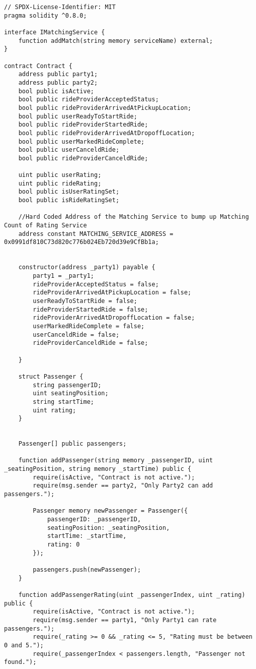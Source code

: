 \begin{lstlisting}
// SPDX-License-Identifier: MIT
pragma solidity ^0.8.0;

interface IMatchingService {
    function addMatch(string memory serviceName) external;
}

contract Contract {
    address public party1;
    address public party2;
    bool public isActive;
    bool public rideProviderAcceptedStatus;
    bool public rideProviderArrivedAtPickupLocation;
    bool public userReadyToStartRide;
    bool public rideProviderStartedRide;
    bool public rideProviderArrivedAtDropoffLocation;
    bool public userMarkedRideComplete;
    bool public userCanceldRide;
    bool public rideProviderCanceldRide;

    uint public userRating;
    uint public rideRating;
    bool public isUserRatingSet;
    bool public isRideRatingSet;

    //Hard Coded Address of the Matching Service to bump up Matching Count of Rating Service
    address constant MATCHING_SERVICE_ADDRESS = 0x0991df810C73d820c776b024Eb720d39e9CfBb1a;


    constructor(address _party1) payable {
        party1 = _party1;
        rideProviderAcceptedStatus = false;
        rideProviderArrivedAtPickupLocation = false;
        userReadyToStartRide = false;
        rideProviderStartedRide = false;
        rideProviderArrivedAtDropoffLocation = false;
        userMarkedRideComplete = false;
        userCanceldRide = false;
        rideProviderCanceldRide = false;

    }

    struct Passenger {
        string passengerID;
        uint seatingPosition;
        string startTime;
        uint rating;
    }


    Passenger[] public passengers;

    function addPassenger(string memory _passengerID, uint _seatingPosition, string memory _startTime) public {
        require(isActive, "Contract is not active.");
        require(msg.sender == party2, "Only Party2 can add passengers.");

        Passenger memory newPassenger = Passenger({
            passengerID: _passengerID,
            seatingPosition: _seatingPosition,
            startTime: _startTime,
            rating: 0
        });

        passengers.push(newPassenger);
    }

    function addPassengerRating(uint _passengerIndex, uint _rating) public {
        require(isActive, "Contract is not active.");
        require(msg.sender == party1, "Only Party1 can rate passengers.");
        require(_rating >= 0 && _rating <= 5, "Rating must be between 0 and 5.");
        require(_passengerIndex < passengers.length, "Passenger not found.");


\end{lstlisting}
